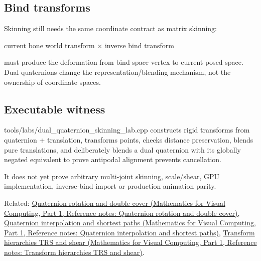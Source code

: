 \subsection{Bind transforms}\label{appendix-921f3f2efb53-bind-transforms}

\hypertarget{appendix-921f3f2efb53-bind-transforms}{}

Skinning still needs the same coordinate contract as matrix skinning:

current bone world transform × inverse bind transform

must produce the deformation from bind-space vertex to current posed space. Dual quaternions change the representation/blending mechanism, not the ownership of coordinate spaces.

\subsection{Executable witness}\label{appendix-921f3f2efb53-executable-witness}

\hypertarget{appendix-921f3f2efb53-executable-witness}{}

tools/labs/dual\_quaternion\_skinning\_lab.cpp constructs rigid transforms from quaternion + translation, transforms points, checks distance preservation, blends pure translations, and deliberately blends a dual quaternion with its globally negated equivalent to prove antipodal alignment prevents cancellation.

It does not yet prove arbitrary multi-joint skinning, scale/shear, GPU implementation, inverse-bind import or production animation parity.

Related: \href{../02-Mathematics-for-Visual-Computing-P01/main.pdf\#nameddest=appendix-8e61ab68f6b2}{Quaternion rotation and double cover (Mathematics for Visual Computing, Part 1, Reference notes: Quaternion rotation and double cover)}, \href{../02-Mathematics-for-Visual-Computing-P01/main.pdf\#nameddest=appendix-9b4b8254f26b}{Quaternion interpolation and shortest paths (Mathematics for Visual Computing, Part 1, Reference notes: Quaternion interpolation and shortest paths)}, \href{../02-Mathematics-for-Visual-Computing-P01/main.pdf\#nameddest=appendix-292c061cd47c}{Transform hierarchies TRS and shear (Mathematics for Visual Computing, Part 1, Reference notes: Transform hierarchies TRS and shear)}.
